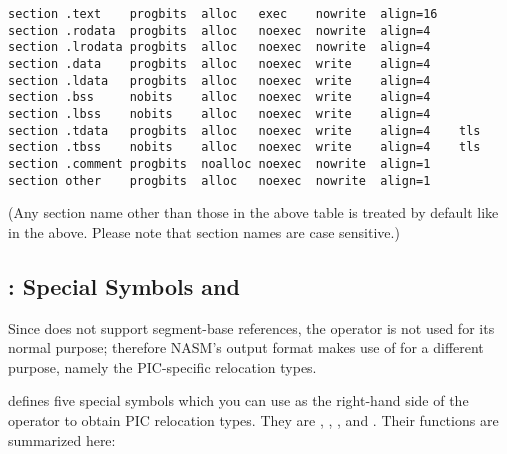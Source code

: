 \begin{lstlisting}
section .text    progbits  alloc   exec    nowrite  align=16
section .rodata  progbits  alloc   noexec  nowrite  align=4
section .lrodata progbits  alloc   noexec  nowrite  align=4
section .data    progbits  alloc   noexec  write    align=4
section .ldata   progbits  alloc   noexec  write    align=4
section .bss     nobits    alloc   noexec  write    align=4
section .lbss    nobits    alloc   noexec  write    align=4
section .tdata   progbits  alloc   noexec  write    align=4    tls
section .tbss    nobits    alloc   noexec  write    align=4    tls
section .comment progbits  noalloc noexec  nowrite  align=1
section other    progbits  alloc   noexec  nowrite  align=1
\end{lstlisting}

(Any section name other than those in the above table is treated by
default like  in the above. Please note that section
names are case sensitive.)

\subsection{: 
Special Symbols and }
\label{subsec:elfwrt}

Since  does not support segment-base references, the 
operator is not used for its normal purpose; therefore NASM's 
output format makes use of  for a different purpose, namely the
PIC-specific relocation types.

 defines five special symbols which you can use as the
right-hand side of the  operator to obtain PIC relocation
types. They are , , ,
 and . Their functions are summarized here:

